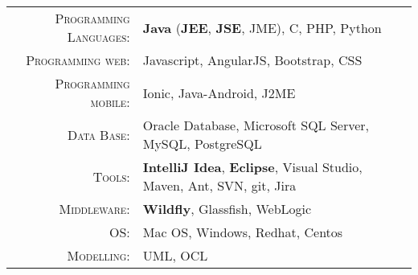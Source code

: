 %
%
%

\renewcommand{\arraystretch}{1.1}

	\begin{tabular}{>{}r>{}p{13cm}}
		\textsc{Programming Languages:}  		&   \textbf{Java} (\textbf{JEE}, \textbf{JSE}, JME), C, PHP, Python\\
		\textsc{Programming web:}               	&   Javascript, AngularJS, Bootstrap, CSS\\
		\textsc{Programming mobile:}               	&   Ionic, Java-Android, J2ME\\ 
		\textsc{Data Base:}                  &   Oracle Database, Microsoft SQL Server, MySQL, PostgreSQL \\
		\textsc{Tools:}	  		&   \textbf {IntelliJ Idea}, \textbf {Eclipse}, Visual Studio, Maven, Ant, SVN, git, Jira\\
		\textsc{Middleware:}				        &   \textbf{Wildfly}, Glassfish, WebLogic\\
		\textsc{OS:}	        &   Mac OS, Windows, Redhat, Centos\\
		\textsc{Modelling:}				        &   UML, OCL\\
	\end{tabular}
